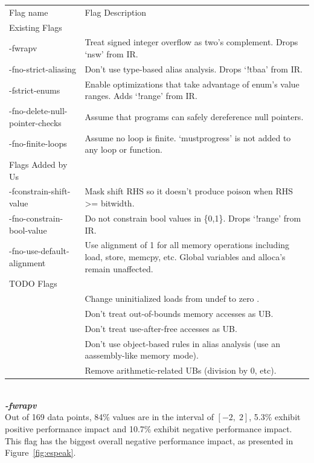 \documentclass{sciposter}
\begin{document}
\begin{multicols}{3}
\begin{tabular}{p{8cm}|p{15cm}|}
\rowcolor{gray!50}
Flag name & Flag Description\\
Existing Flags & \\
-fwrapv & Treat signed integer overflow as two's complement. Drops `nsw' from IR.\\
-fno-strict-aliasing & Don't use type-based alias analysis. Drops `!tbaa' from IR. \\
-fstrict-enums & Enable optimizations that take advantage of enum's value ranges. Adds `!range' from IR.\\
-fno-delete-null-pointer-checks & Assume that programs can safely dereference null pointers. \\
-fno-finite-loops & Assume no loop is finite. `mustprogress' is not added to any loop or function.\\
Flags Added by Us & \\
-fconstrain-shift-value & Mask shift RHS so it doesn't produce poison when RHS >= bitwidth. \\
-fno-constrain-bool-value & Do not constrain bool values in \{0,1\}. Drops `!range' from IR.\\
-fno-use-default-alignment & Use alignment of 1 for all memory operations including load, store, memcpy, etc. Global variables and alloca's remain unaffected.\\
TODO Flags & \\
& Change uninitialized loads from undef to zero . \\
& Don't treat out-of-bounds memory accesses as UB. \\
& Don't treat use-after-free accesses as UB.\\
& Don't use object-based rules in alias analysis (use an aassembly-like memory mode). \\
& Remove arithmetic-related UBs (division by 0, etc). \\
\end{tabular} \\

\textbf{\textit{-fwrapv}} \\
Out of 169 data points, 84\% values are in the interval of \( [-2,\;2] \), 
5.3\% exhibit positive performance impact and 10.7\% exhibit negative
performance impact. This flag has the biggest overall negative 
performance impact, as presented in Figure~\ref{fig:espeak}.


\end{multicols}
\end{document}
